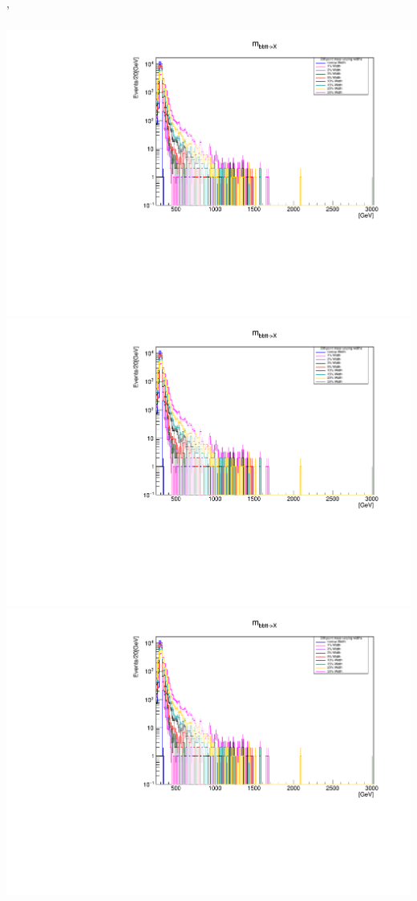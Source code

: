 \documentclass[a4wide,10pt]{article}
\begin{document}
'

\includegraphics[scale=0.50,page=1]{../Pdfs/bb+tt->X_Mass_VaryingWidths.pdf}
\includegraphics[scale=0.50,page=2]{../Pdfs/bb+tt->X_Mass_VaryingWidths.pdf}
\includegraphics[scale=0.50,page=3]{../Pdfs/bb+tt->X_Mass_VaryingWidths.pdf}
\end{document}
